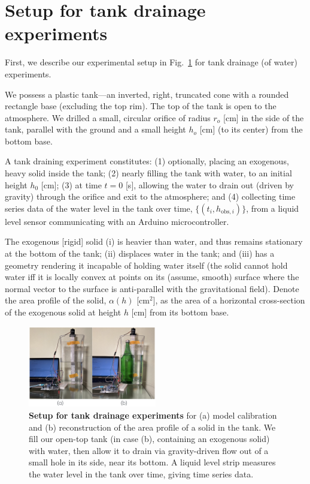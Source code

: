 \documentclass[a4paper,fleqn]{cas-dc}
\begin{document}
\section{Setup for tank drainage experiments} \label{sec:expt}
First, we describe our experimental setup in Fig.~\ref{fig:photo_of_tank} for tank drainage (of water) experiments.

We possess a plastic tank---an inverted, right, truncated cone with a rounded rectangle base (excluding the top rim). The top of the tank is open to the atmosphere.
We drilled a small, circular orifice of radius $r_o$ [cm] in the side of the tank, parallel with the ground and a small height $h_o$ [cm] (to its center) from the bottom base.

A tank draining experiment constitutes: 
(1) optionally, placing an exogenous, heavy solid inside the tank; 
(2) nearly filling the tank with water, to an initial height $h_0$ [cm]; 
(3) at time $t=0$ [s], allowing the water to drain out (driven by gravity) through the orifice and exit to the atmosphere; and 
(4) collecting time series data of the water level in the tank over time, $\{(t_i, h_{\text{obs}, i}) \}$, from a liquid level sensor communicating with an Arduino microcontroller. 

The exogenous [rigid] solid (i) is heavier than water, and thus remains stationary at the bottom of the tank; (ii) displaces water in the tank; and (iii) has a geometry rendering it incapable of holding water itself (the solid cannot hold water iff it is locally convex at points on its (assume, smooth) surface where the normal vector to the surface is anti-parallel with the gravitational field). Denote the area profile of the solid, $\alpha(h)$ [cm$^2$], as the area of a horizontal cross-section of the exogenous solid at height $h$ [cm] from its bottom base.

\begin{figure}[h!]
\begin{center}
	\includegraphics[width=0.5\textwidth]{real_expt.png}
	\caption{\textbf{Setup for tank drainage experiments} for (a) model calibration and (b) reconstruction of the area profile of a solid in the tank.
	We fill our open-top tank (in case (b), containing an exogenous solid) with water, then allow it to drain via gravity-driven flow out of a small hole in its side, near its bottom. A liquid level strip measures the water level in the tank over time, giving time series data.
	}
	\label{fig:photo_of_tank}
\end{center}
\end{figure}
\end{document}
